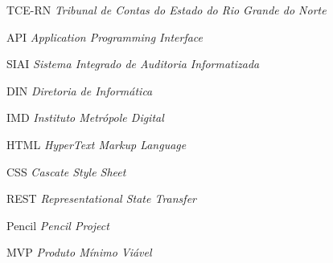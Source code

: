\documentclass[
	12pt,				%
	oneside,
	a4paper,			%
	chapter=TITLE,
	sumario=tradicional,
	english,			%
	brazil,				%
	]{abntex2}
\begin{document}

\frenchspacing 

\pretextual

\imprimircapa

\imprimirfolhaderosto




% 




\listoffigures*
\cleardoublepage

\listoftables*
\cleardoublepage

\begin{siglas}
	\item[TCE-RN] \textit{Tribunal de Contas do Estado do Rio Grande do Norte}
	\item[API] \textit{Application Programming Interface}
	\item[SIAI] \textit{Sistema Integrado de Auditoria Informatizada}
	\item[DIN] \textit{Diretoria de Informática}
	\item[IMD] \textit{Instituto Metrópole Digital}
	\item[HTML] \textit{HyperText Markup Language}
	\item[CSS] \textit{Cascate Style Sheet}
	\item[REST] \textit{Representational State Transfer}
	\item[Pencil] \textit{Pencil Project}
	\item[MVP] \textit{ Produto Mínimo Viável}
\end{siglas}
\end{document}
